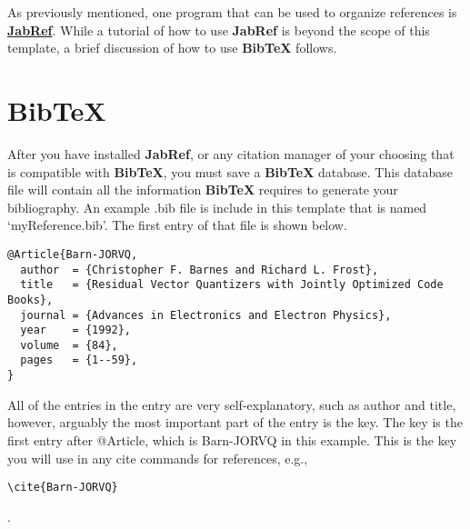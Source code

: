 %
%
%
%


\label{appendix:02}

As previously mentioned, one program that can be used to organize references is \href{http://www.jabref.org}{\textbf{JabRef}}. While a tutorial of how to use \textbf{JabRef} is beyond the scope of this template, a brief discussion of how to use \textbf{BibTeX} follows.

\section{BibTeX}
After you have installed \textbf{JabRef}, or any citation manager of your choosing that is compatible with \textbf{BibTeX}, you must save a \textbf{BibTeX} database. This database file will contain all the information \textbf{BibTeX} requires to generate your bibliography. An example .bib file is include in this template that is named `myReference.bib'. The first entry of that file is shown below.

{\footnotesize \begin{verbatim}
@Article{Barn-JORVQ,
  author  = {Christopher F. Barnes and Richard L. Frost},
  title   = {Residual Vector Quantizers with Jointly Optimized Code Books},
  journal = {Advances in Electronics and Electron Physics},
  year    = {1992},
  volume  = {84},
  pages   = {1--59},
}
\end{verbatim}}

All of the entries in the entry are very self-explanatory, such as author and title, however, arguably the most important part of the entry is the key. The key is the first entry after @Article, which is Barn-JORVQ in this example. This is the key you will use in any cite commands for references, e.g.,

{\footnotesize\begin{verbatim}\cite{Barn-JORVQ}\end{verbatim}}.


